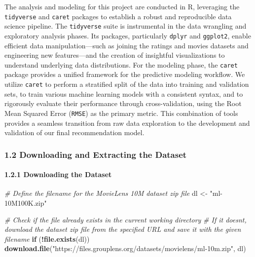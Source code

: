 \documentclass[
]{article}
\newenvironment{Shaded}{\begin{snugshade}}{\end{snugshade}}
\newcommand{\CommentTok}[1]{\textcolor[rgb]{0.56,0.35,0.01}{\textit{#1}}}
\newcommand{\ControlFlowTok}[1]{\textcolor[rgb]{0.13,0.29,0.53}{\textbf{#1}}}
\newcommand{\FunctionTok}[1]{\textcolor[rgb]{0.13,0.29,0.53}{\textbf{#1}}}
\newcommand{\NormalTok}[1]{#1}
\newcommand{\OtherTok}[1]{\textcolor[rgb]{0.56,0.35,0.01}{#1}}
\newcommand{\SpecialCharTok}[1]{\textcolor[rgb]{0.81,0.36,0.00}{\textbf{#1}}}
\newcommand{\StringTok}[1]{\textcolor[rgb]{0.31,0.60,0.02}{#1}}
\begin{document}
The analysis and modeling for this project are conducted in R,
leveraging the \texttt{tidyverse} and \texttt{caret} packages to
establish a robust and reproducible data science pipeline. The
\texttt{tidyverse} suite is instrumental in the data wrangling and
exploratory analysis phases. Its packages, particularly \texttt{dplyr}
and \texttt{ggplot2}, enable efficient data manipulation---such as
joining the ratings and movies datasets and engineering new
features---and the creation of insightful visualizations to understand
underlying data distributions. For the modeling phase, the
\texttt{caret} package provides a unified framework for the predictive
modeling workflow. We utilize \texttt{caret} to perform a stratified
split of the data into training and validation sets, to train various
machine learning models with a consistent syntax, and to rigorously
evaluate their performance through cross-validation, using the Root Mean
Squared Error (\texttt{RMSE}) as the primary metric. This combination of
tools provides a seamless transition from raw data exploration to the
development and validation of our final recommendation model.

\subsubsection{1.2 Downloading and Extracting the
Dataset}\label{downloading-and-extracting-the-dataset}

\paragraph{1.2.1 Downloading the Dataset}\label{downloading-the-dataset}

\begin{Shaded}
\begin{Highlighting}[]
\CommentTok{\# Define the filename for the MovieLens 10M dataset zip file}
\NormalTok{dl }\OtherTok{\textless{}{-}} \StringTok{"ml{-}10M100K.zip"}

\CommentTok{\# Check if the file already exists in the current working directory}
\CommentTok{\# If it doesn\textquotesingle{}t, download the dataset zip file from the specified URL and save it with the given filename}
\ControlFlowTok{if}\NormalTok{ (}\SpecialCharTok{!}\FunctionTok{file.exists}\NormalTok{(dl))}
  \FunctionTok{download.file}\NormalTok{(}\StringTok{"https://files.grouplens.org/datasets/movielens/ml{-}10m.zip"}\NormalTok{, dl)}
\end{Highlighting}
\end{Shaded}
\end{document}
